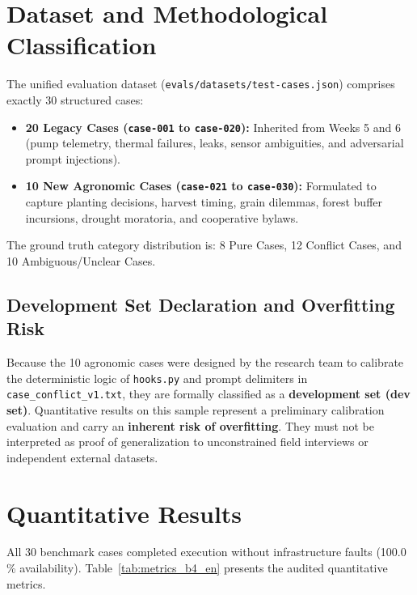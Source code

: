 \documentclass[11pt,a4paper]{article}
\begin{document}
\section{Dataset and Methodological Classification}
The unified evaluation dataset (\texttt{evals/datasets/test-cases.json}) comprises exactly 30 structured cases:
\begin{itemize}[leftmargin=*]
    \item \textbf{20 Legacy Cases (\texttt{case-001} to \texttt{case-020}):} Inherited from Weeks 5 and 6 (pump telemetry, thermal failures, leaks, sensor ambiguities, and adversarial prompt injections).
    \item \textbf{10 New Agronomic Cases (\texttt{case-021} to \texttt{case-030}):} Formulated to capture planting decisions, harvest timing, grain dilemmas, forest buffer incursions, drought moratoria, and cooperative bylaws.
\end{itemize}

The ground truth category distribution is: 8 Pure Cases, 12 Conflict Cases, and 10 Ambiguous/Unclear Cases.

\subsection{Development Set Declaration and Overfitting Risk}
Because the 10 agronomic cases were designed by the research team to calibrate the deterministic logic of \texttt{hooks.py} and prompt delimiters in \texttt{case\_conflict\_v1.txt}, they are formally classified as a \textbf{development set (dev set)}. Quantitative results on this sample represent a preliminary calibration evaluation and carry an \textbf{inherent risk of overfitting}. They must not be interpreted as proof of generalization to unconstrained field interviews or independent external datasets.

\section{Quantitative Results}
All 30 benchmark cases completed execution without infrastructure faults (100.0\,\% availability). Table~\ref{tab:metrics_b4_en} presents the audited quantitative metrics.
\end{document}
